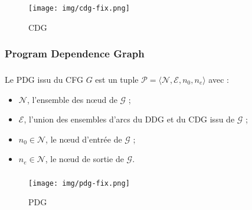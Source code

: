 \documentclass{beamer}
\begin{document}
      \begin{frame}
        \frametitle{\subsecname}
        \framesubtitle{\subsubsecname}

        \begin{figure}
          \centering
          \texttt{[image: img/cdg-fix.png]}
          \caption{CDG}
        \end{figure}
      \end{frame}

    \subsubsection*{Program Dependence Graph}

      \begin{frame}
        \frametitle{\subsecname}
        \framesubtitle{\subsubsecname}

        Le PDG issu du CFG $G$ est un tuple $\mathcal{P} = \langle
        \mathcal{N},\mathcal{E},n_0,n_e \rangle$ avec :
        \begin{itemize}
          \item $\mathcal{N}$, l'ensemble des n{\oe}ud de $\mathcal{G}$ ;
          \item $\mathcal{E}$, l'union des ensembles d'arcs du DDG et du CDG issu de $\mathcal{G}$ ;
          \item $n_0 \in \mathcal{N}$, le n{\oe}ud d'entrée de $\mathcal{G}$ ;
          \item $n_e \in \mathcal{N}$, le n{\oe}ud de sortie de $\mathcal{G}$.
        \end{itemize}
      \end{frame}

      \begin{frame}
        \frametitle{\subsecname}
        \framesubtitle{\subsubsecname}

          \begin{figure}
            \centering
            \texttt{[image: img/pdg-fix.png]}
            \caption{PDG}
          \end{figure}
      \end{frame}
\end{document}

